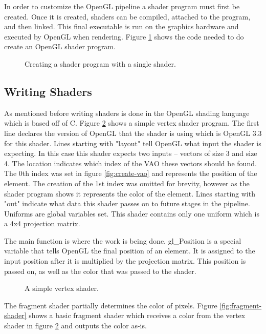\documentclass{article}
\begin{document}
In order to customize the OpenGL pipeline a shader program must first be created. Once it is created, shaders can be compiled, attached to the program, and then linked. This final executable is run on the graphics hardware and executed by OpenGL when rendering. Figure \ref{fig:shader-program} shows the code needed to do create an OpenGL shader program.

\begin{figure}[b]
	
	\caption{Creating a shader program with a single shader.}
	\label{fig:shader-program}
\end{figure}

\subsection{Writing Shaders}

As mentioned before writing shaders is done in the OpenGL shading language which is based off of C. Figure \ref{fig:vertex-shader} shows a simple vertex shader program. The first line declares the version of OpenGL that the shader is using which is OpenGL 3.3 for this shader. Lines starting with "layout" tell OpenGL what input the shader is expecting. In this case this shader expects two inputs -- vectors of size 3 and size 4. The location indicates which index of the VAO these vectors should be found. The 0th index was set in figure \ref{fig:create-vao} and represents the position of the element. The creation of the 1st index was omitted for brevity, however as the shader program shows it represents the color of the element. Lines starting with "out" indicate what data this shader passes on to future stages in the pipeline. Uniforms are global variables set. This shader contains only one uniform which is a 4x4 projection matrix.

The main function is where the work is being done. gl\_Position is a special variable that tells OpenGL the final position of an element. It is assigned to the input position after it is multiplied by the projection matrix. This position is passed on, as well as the color that was passed to the shader.

\begin{figure}[h]
	
	\caption{A simple vertex shader.}
	\label{fig:vertex-shader}
\end{figure}

The fragment shader partially determines the color of pixels. Figure \ref{fig:fragment-shader} shows a basic fragment shader which receives a color from the vertex shader in figure \ref{fig:vertex-shader} and outputs the color as-is.
\end{document}
